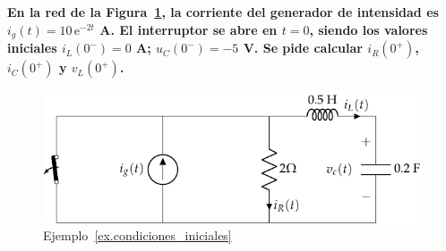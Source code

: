\documentclass[11pt]{book} %
\begin{document}
	\begin{example}\label{ex.condiciones_iniciales}
	    \textbf{En la red de la Figura~\ref{fig.ej_condiciones_iniciales}, la corriente del generador de intensidad es $i_g(t) = 10\,\mathrm{e}^{-2t}$ A. El interruptor se abre en $t = 0$, siendo los valores iniciales $i_L(0^-) = 0$ A; $u_C(0^-) = -5$ V. Se pide calcular $i_R(0^+)$, $i_C(0^+)$ y $v_L(0^+)$.}
\begin{figure}[H]
    \centering
    \includegraphics{../figs/ej_condiciones_iniciales.pdf}
    \caption{Ejemplo~\ref{ex.condiciones_iniciales}}
    \label{fig.ej_condiciones_iniciales}
\end{figure}


\end{example}
\end{document}
